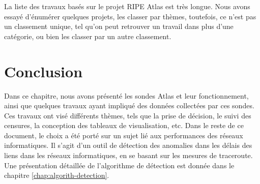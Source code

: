 La liste des travaux basés sur le projet RIPE Atlas est très longue. Nous avons essayé d'énumérer quelques projets, les classer par thèmes, toutefois, ce n'est pas un classement unique, tel qu'on peut retrouver un travail dans plus d'une catégorie, ou bien les classer par un autre classement.

\section{Conclusion}

Dans ce chapitre, nous avons présenté les sondes Atlas et leur fonctionnement, ainsi que quelques travaux ayant impliqué des données collectées par ces sondes.  Ces travaux ont visé différents thèmes, tels que la prise de décision, le suivi des censures, la conception des tableaux de visualisation, etc. Dans le reste de ce document, le choix a été porté sur un sujet lié aux performances des réseaux informatiques. Il s'agit d'un outil de détection des anomalies dans les délais des liens dans les réseaux informatiques, en se basant sur les mesures de traceroute. Une présentation détaillée de l'algorithme de détection est donnée dans le chapitre \ref{chap:algorith-detection}.






